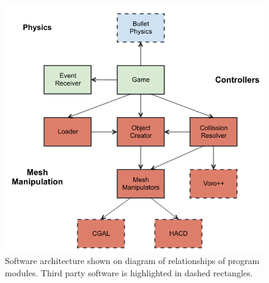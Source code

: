 \begin{figure}[ht!]
        \centering
        \includegraphics[width=\textwidth]{img/objectmodel}
        \caption{Software architecture shown on diagram of relationships of program modules. Third party software is highlighted in dashed rectangles.}
        \label{fig:modules}
\end{figure}

